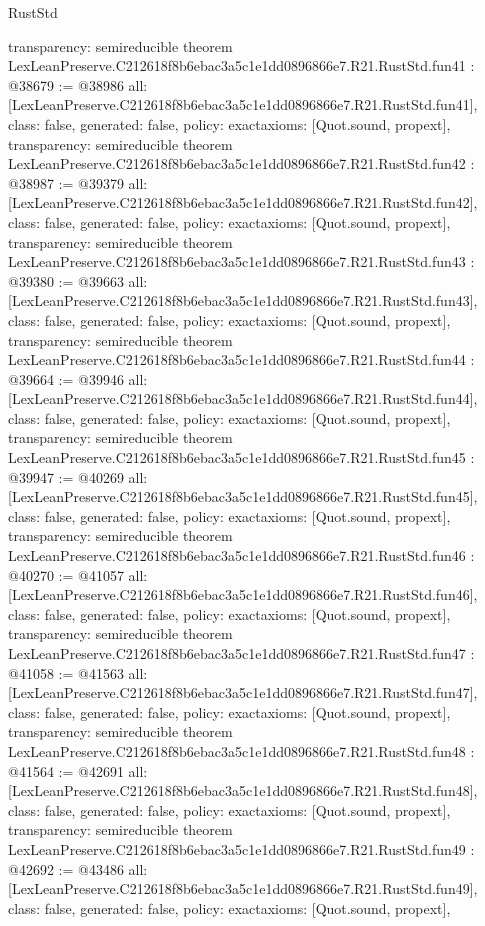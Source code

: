 \begin{lexlean}{RustStd}
\begin{coremodule}
{  transparency: semireducible
}
theorem LexLeanPreserve.C212618f8b6ebac3a5c1e1dd0896866e7.R21.RustStd.fun41 : @38679 := @38986 {
  all: [LexLeanPreserve.C212618f8b6ebac3a5c1e1dd0896866e7.R21.RustStd.fun41],
  class: false,
  generated: false,
  policy: exact{axioms: [Quot.sound, propext]},
  transparency: semireducible
}
theorem LexLeanPreserve.C212618f8b6ebac3a5c1e1dd0896866e7.R21.RustStd.fun42 : @38987 := @39379 {
  all: [LexLeanPreserve.C212618f8b6ebac3a5c1e1dd0896866e7.R21.RustStd.fun42],
  class: false,
  generated: false,
  policy: exact{axioms: [Quot.sound, propext]},
  transparency: semireducible
}
theorem LexLeanPreserve.C212618f8b6ebac3a5c1e1dd0896866e7.R21.RustStd.fun43 : @39380 := @39663 {
  all: [LexLeanPreserve.C212618f8b6ebac3a5c1e1dd0896866e7.R21.RustStd.fun43],
  class: false,
  generated: false,
  policy: exact{axioms: [Quot.sound, propext]},
  transparency: semireducible
}
theorem LexLeanPreserve.C212618f8b6ebac3a5c1e1dd0896866e7.R21.RustStd.fun44 : @39664 := @39946 {
  all: [LexLeanPreserve.C212618f8b6ebac3a5c1e1dd0896866e7.R21.RustStd.fun44],
  class: false,
  generated: false,
  policy: exact{axioms: [Quot.sound, propext]},
  transparency: semireducible
}
theorem LexLeanPreserve.C212618f8b6ebac3a5c1e1dd0896866e7.R21.RustStd.fun45 : @39947 := @40269 {
  all: [LexLeanPreserve.C212618f8b6ebac3a5c1e1dd0896866e7.R21.RustStd.fun45],
  class: false,
  generated: false,
  policy: exact{axioms: [Quot.sound, propext]},
  transparency: semireducible
}
theorem LexLeanPreserve.C212618f8b6ebac3a5c1e1dd0896866e7.R21.RustStd.fun46 : @40270 := @41057 {
  all: [LexLeanPreserve.C212618f8b6ebac3a5c1e1dd0896866e7.R21.RustStd.fun46],
  class: false,
  generated: false,
  policy: exact{axioms: [Quot.sound, propext]},
  transparency: semireducible
}
theorem LexLeanPreserve.C212618f8b6ebac3a5c1e1dd0896866e7.R21.RustStd.fun47 : @41058 := @41563 {
  all: [LexLeanPreserve.C212618f8b6ebac3a5c1e1dd0896866e7.R21.RustStd.fun47],
  class: false,
  generated: false,
  policy: exact{axioms: [Quot.sound, propext]},
  transparency: semireducible
}
theorem LexLeanPreserve.C212618f8b6ebac3a5c1e1dd0896866e7.R21.RustStd.fun48 : @41564 := @42691 {
  all: [LexLeanPreserve.C212618f8b6ebac3a5c1e1dd0896866e7.R21.RustStd.fun48],
  class: false,
  generated: false,
  policy: exact{axioms: [Quot.sound, propext]},
  transparency: semireducible
}
theorem LexLeanPreserve.C212618f8b6ebac3a5c1e1dd0896866e7.R21.RustStd.fun49 : @42692 := @43486 {
  all: [LexLeanPreserve.C212618f8b6ebac3a5c1e1dd0896866e7.R21.RustStd.fun49],
  class: false,
  generated: false,
  policy: exact{axioms: [Quot.sound, propext]},
}
\end{coremodule}
\end{lexlean}
